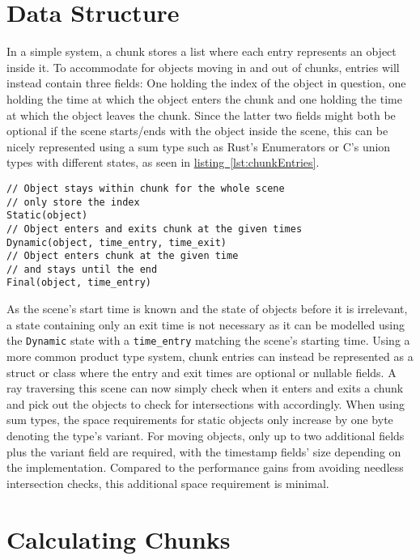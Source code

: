 \section{Data Structure}

In a simple system, a chunk stores a list where each entry represents an object inside it.
To accommodate for objects moving in and out of chunks, entries will instead contain three fields:
One holding the index of the object in question,
one holding the time at which the object enters the chunk
and one holding the time at which the object leaves the chunk.
Since the latter two fields might both be optional if the scene starts/ends with the object inside the scene,
this can be nicely represented using a sum type such as Rust's Enumerators or C's union types with different states,
as seen in \hyperref[lst:chunkEntries]{listing~\ref*{lst:chunkEntries}}.
\begin{lstlisting}[basicstyle=\small, caption={[Time-based chunk entry states]Possible time-based chunk entry states, using a sum type}, label={lst:chunkEntries}, float, floatplacement=h!]
// Object stays within chunk for the whole scene
// only store the index
Static(object)
// Object enters and exits chunk at the given times
Dynamic(object, time_entry, time_exit)
// Object enters chunk at the given time
// and stays until the end
Final(object, time_entry)
\end{lstlisting}
\newline
As the scene's start time is known and the state of objects before it is irrelevant,
a state containing only an exit time is not necessary as it can be modelled using the
\verb|Dynamic| state with a \verb|time_entry| matching the scene's starting time.
Using a more common product type system, chunk entries can instead be represented as a
struct or class where the entry and exit times are optional or nullable fields.
\newline
A ray traversing this scene can now simply check when it enters and exits a chunk
and pick out the objects to check for intersections with accordingly.
When using sum types, the space requirements for static objects only increase by one byte denoting the type's variant.
For moving objects, only up to two additional fields plus the variant field are required,
with the timestamp fields' size depending on the implementation.
Compared to the performance gains from avoiding needless intersection checks,
this additional space requirement is minimal.

\section{Calculating Chunks}

